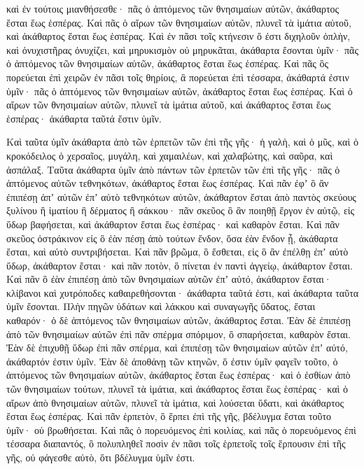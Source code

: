 {καὶ ἐν τούτοις μιανθήσεσθε· πᾶς ὁ ἁπτόμενος τῶν θνησιμαίων αὐτῶν, ἀκάθαρτος ἔσται ἕως ἑσπέρας.
Καὶ πᾶς ὁ αἴρων τῶν θνησιμαίων αὐτῶν, πλυνεῖ τὰ ἱμάτια αὐτοῦ, καὶ ἀκάθαρτος ἔσται ἕως ἑσπέρας.
Καὶ ἐν πᾶσι τοῖς κτήνεσιν ὅ ἐστι διχηλοῦν ὁπλὴν, καὶ ὀνυχιστῆρας ὀνυχίζει, καὶ μηρυκισμὸν οὐ μηρυκᾶται, ἀκάθαρτα ἔσονται ὑμῖν· πᾶς ὁ ἁπτόμενος τῶν θνησιμαίων αὐτῶν, ἀκάθαρτος ἔσται ἕως ἑσπέρας.
Καὶ πᾶς ὃς πορεύεται ἐπὶ χειρῶν ἐν πᾶσι τοῖς θηρίοις, ἃ πορεύεται ἐπὶ τέσσαρα, ἀκάθαρτά ἐστιν ὑμῖν· πᾶς ὁ ἁπτόμενος τῶν θνησιμαίων αὐτῶν, ἀκάθαρτος ἔσται ἕως ἑσπέρας.
Καὶ ὁ αἴρων τῶν θνησιμαίων αὐτῶν, πλυνεῖ τὰ ἱμάτια αὐτοῦ, καὶ ἀκάθαρτος ἔσται ἕως ἑσπέρας· ἀκάθαρτα ταῦτά ἔστιν ὑμῖν.
\par }{\PP {}Καὶ ταῦτα ὑμῖν ἀκάθαρτα ἀπὸ τῶν ἑρπετῶν τῶν ἐπὶ τῆς γῆς· ἡ γαλὴ, καὶ ὁ μῦς, καὶ ὁ κροκόδειλος ὁ χερσαῖος,
μυγάλη, καὶ χαμαιλέων, καὶ χαλαβώτης, καὶ σαῦρα, καὶ ἀσπάλαξ.
Ταῦτα ἀκάθαρτα ὑμῖν ἀπὸ πάντων τῶν ἑρπετῶν τῶν ἐπὶ τῆς γῆς· πᾶς ὁ ἁπτόμενος αὐτῶν τεθνηκότων, ἀκάθαρτος ἔσται ἕως ἑσπέρας.
Καὶ πᾶν ἐφʼ ὃ ἂν ἐπιπέσῃ ἀπʼ αὐτῶν ἐπʼ αὐτὸ τεθνηκότων αὐτῶν, ἀκάθαρτον ἔσται ἀπὸ παντὸς σκεύους ξυλίνου ἢ ἱματίου ἢ δέρματος ἢ σάκκου· πᾶν σκεῦος ὃ ἂν ποιηθῇ ἔργον ἐν αὐτῷ, εἰς ὕδωρ βαφήσεται, καὶ ἀκάθαρτον ἔσται ἕως ἑσπέρας· καὶ καθαρὸν ἔσται.
Καὶ πᾶν σκεῦος ὀστράκινον εἰς ὃ ἐὰν πέσῃ ἀπὸ τούτων ἔνδον, ὅσα ἐὰν ἔνδον ᾖ, ἀκάθαρτα ἔσται, καὶ αὐτὸ συντριβήσεται.
Καὶ πᾶν βρῶμα, ὃ ἔσθεται, εἰς ὃ ἂν ἐπέλθῃ ἐπʼ αὐτὸ ὕδωρ, ἀκάθαρτον ἔσται· καὶ πᾶν ποτὸν, ὃ πίνεται ἐν παντὶ ἀγγείῳ, ἀκάθαρτον ἔσται.
Καὶ πᾶν ὃ ἐὰν ἐπιπέσῃ ἀπὸ τῶν θνησιμαίων αὐτῶν ἐπʼ αὐτό, ἀκάθαρτον ἔσται· κλίβανοι καὶ χυτρόποδες καθαιρεθήσονται· ἀκάθαρτα ταῦτά ἐστι, καὶ ἀκάθαρτα ταῦτα ὑμῖν ἔσονται.
Πλὴν πηγῶν ὑδάτων καὶ λάκκου καὶ συναγωγῆς ὕδατος, ἔσται καθαρόν· ὁ δὲ ἁπτόμενος τῶν θνησιμαίων αὐτῶν, ἀκάθαρτος ἔσται.
Ἐὰν δὲ ἐπιπέσῃ ἀπὸ τῶν θνησιμαίων αὐτῶν ἐπὶ πᾶν σπέρμα σπόριμον, ὃ σπαρήσεται, καθαρὸν ἔσται.
Ἐὰν δὲ ἐπιχυθῇ ὕδωρ ἐπὶ πᾶν σπέρμα, καὶ ἐπιπέσῃ τῶν θνησιμαίων αὐτῶν ἐπʼ αὐτό, ἀκάθαρτόν ἐστιν ὑμῖν.
Ἐὰν δὲ ἀποθάνῃ τῶν κτηνῶν, ὅ ἐστιν ὑμῖν φαγεῖν τοῦτο, ὁ ἁπτόμενος τῶν θνησιμαίων αὐτῶν, ἀκάθαρτος ἔσται ἕως ἑσπέρας·
καὶ ὁ ἐσθίων ἀπὸ τῶν θνησιμαίων τούτων, πλυνεῖ τὰ ἱμάτια, καὶ ἀκάθαρτος ἔσται ἕως ἑσπέρας· καὶ ὁ αἴρων ἀπὸ θνησιμαίων αὐτῶν, πλυνεῖ τὰ ἱμάτια, καὶ λούσεται ὕδατι, καὶ ἀκάθαρτος ἔσται ἕως ἑσπέρας.
Καὶ πᾶν ἑρπετὸν, ὃ ἕρπει ἐπὶ τῆς γῆς, βδέλυγμα ἔσται τοῦτο ὑμῖν· οὐ βρωθήσεται.
Καὶ πᾶς ὁ πορευόμενος ἐπὶ κοιλίας, καὶ πᾶς ὁ πορευόμενος ἐπὶ τέσσαρα διαπαντός, ὃ πολυπληθεῖ ποσὶν ἐν πᾶσι τοῖς ἑρπετοῖς τοῖς ἕρπουσιν ἐπὶ τῆς γῆς, οὐ φάγεσθε αὐτὸ, ὅτι βδέλυγμα ὑμῖν ἐστι.
}
